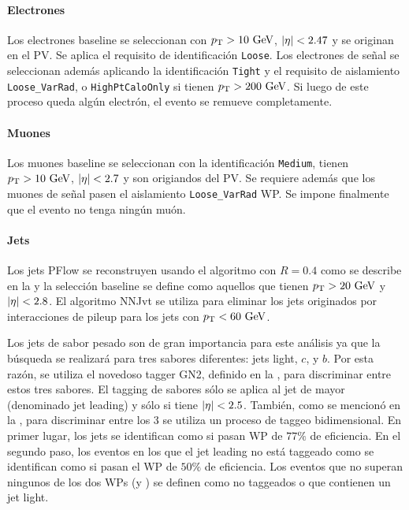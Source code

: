 \paragraph{Electrones}

Los electrones baseline se seleccionan con \(p_{\text{T}} > 10~\text{GeV}\), \(|\eta| < 2.47\) y se originan en el \ac{PV}. Se aplica el requisito de identificación \texttt{Loose}. Los electrones de señal se seleccionan además aplicando la identificación \texttt{Tight} y el requisito de aislamiento \texttt{Loose\_VarRad}, o \texttt{HighPtCaloOnly} si tienen \(p_{\text{T}} > 200~\text{GeV}\). Si luego de este proceso queda algún electrón, el evento se remueve completamente.


\paragraph{Muones}
Los muones baseline se seleccionan con la identificación \texttt{Medium}, tienen \(p_{\text{T}} > 10~\text{GeV}\), \(|\eta| < 2.7\) y son origiandos del \ac{PV}. Se requiere además que los muones de señal pasen el aislamiento \texttt{Loose\_VarRad} \ac{WP}. Se impone finalmente que el evento no tenga ningún muón.


\paragraph{Jets}

Los jets \ac{PFlow} se reconstruyen usando el algoritmo \antikt con \(R=0.4\) como se describe en la \Sect{\ref{sec:objects:jets}} y la selección baseline se define como aquellos que tienen \(p_{\text{T}}>20~\text{GeV}\) y \(|\eta|<2.8\). El algoritmo \ac{NNJvt} se utiliza para eliminar los jets originados por interacciones de pileup para los jets con \(p_{\text{T}}<60~\text{GeV}\).

Los jets de sabor pesado son de gran importancia para este análisis ya que la búsqueda se realizará para tres sabores diferentes: jets light, \(c\), y \(b\). Por esta razón, se utiliza el novedoso tagger GN2, definido en la \Sect{\ref{sec:objects:ftag}}, para discriminar entre estos tres sabores.
El tagging de sabores sólo se aplica al jet de mayor \pt (denominado jet leading) y sólo si tiene \(|\eta| < 2.5\).
También, como se mencionó en la \Sect{\ref{sec:objects:ftag}}, para discriminar entre los 3 se utiliza un proceso de taggeo bidimensional. En primer lugar, los jets se identifican como \bjets si pasan \ac{WP} de \(77\%\) de eficiencia.
En el segundo paso, los eventos en los que el jet leading no está taggeado como \bjet se identifican como \cjet si pasan el \ac{WP} de \(50\%\) de eficiencia. Los eventos que no superan ningunos de los dos \acp{WP} (\btag y \ctag) se definen como no taggeados o que contienen un jet light.


